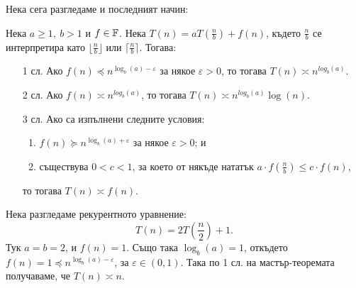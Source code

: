 Нека сега разгледаме и последният начин:
\begin{theorem}
    Нека $a \geq 1, \: b > 1$ и $f \in \mathbb{F}$.
    Нека $T(n) = aT(\frac{n}{b}) + f(n)$, където $\frac{n}{b}$ се интерпретира като $\lfloor \frac{n}{b} \rfloor$ или $\lceil \frac{n}{b} \rceil$.
    Тогава:
    \begin{itemize}
        \item[1 сл.] Ако $f(n) \preceq n^{\log_b(a) - \varepsilon}$ за някое $\varepsilon > 0$, то тогава $T(n) \asymp n^{log_b(a)}$.
        \item[2 сл.] Ако $f(n) \asymp n^{log_b(a)}$, то тогава $T(n) \asymp n^{log_b(a)} \log(n)$.
        \item[3 сл.] Ако са изпълнени следните условия:
              \begin{enumerate}
                  \item $f(n) \succeq n^{\log_b(a) + \varepsilon}$ за някое $\varepsilon > 0$; и
                  \item съществува $0 < c < 1$, за което от някъде нататък $a \cdot f(\frac{n}{b}) \leq c \cdot f(n)$,
              \end{enumerate}
              то тогава $T(n) \asymp f(n)$.
    \end{itemize}
\end{theorem}

Нека разгледаме рекурентното уравнение:
\[
    T(n) = 2T(\frac{n}{2}) + 1.
\]
Тук $a = b = 2$, и $f(n) = 1$.
Също така $\log_b(a) = 1$, откъдето $f(n) = 1 \preceq n^{\log_b(a) - \varepsilon}$, за $\varepsilon \in (0, 1)$.
Така по 1 сл. на мастър-теоремата получаваме, че $T(n) \asymp n$.
